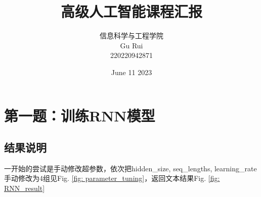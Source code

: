 \documentclass[letterpaper,12pt]{article}
\begin{document}
	
	
	\title{\songti {}高级人工智能课程汇报}
	\author{信息科学与工程学院 \\ \textrm{Gu Rui} \\ 220220942871}
	\date{\textrm{June 11 2023}}
	\maketitle
	
	\renewcommand{\figurename}{Figure} %
	\renewcommand{\contentsname}{Contents}
	\renewcommand{\tablename}{Table}
	\tableofcontents  %
	
	\section{第一题：训练RNN模型}
	
		\subsection{结果说明}
	
			一开始的尝试是手动修改超参数，依次把hidden\_size, seq\_lengths, learning\_rate手动修改为4组见Fig. \ref{fig: parameter_tuning}，返回文本结果Fig. \ref{fig: RNN_result}
	
\end{document}
